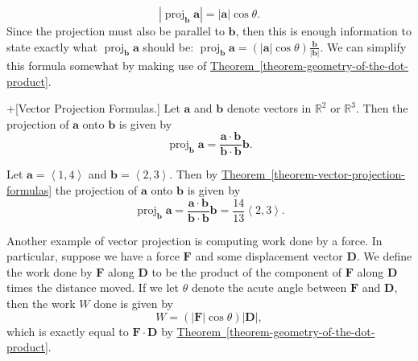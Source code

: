 \documentclass[10pt,]{book}
\theoremstyle{ptxplainnotitle}
\theoremstyle{ptxplaintitle}
\theoremstyle{ptxplainnotitle}
\theoremstyle{ptxplaintitle}
\theoremstyle{ptxplainnotitle}
\theoremstyle{ptxplaintitle}
\theoremstyle{ptxdefinitionnotitle}
\theoremstyle{ptxdefinitiontitle}
\theoremstyle{ptxdefinitionnotitle}
\theoremstyle{ptxdefinitiontitle}
\theoremstyle{ptxdefinitionnotitle}
\theoremstyle{ptxdefinitiontitle}
\theoremstyle{ptxdefinitionnotitle}
\theoremstyle{ptxdefinitiontitle}
\theoremstyle{ptxdefinitionnotitle}
\theoremstyle{ptxdefinitiontitle}
\numberwithin{equation}{section}
\newcommand{\RR}{\mathbb{R}}
\newcommand{\vv}[1]{\mathbf{#1}}
\newcommand{\dotprod}[1]{\left\langle #1 \right\rangle}
\newcommand{\proj}[2]{\operatorname{proj}_{#1} #2}
\begin{document}
%
\begin{equation*}
|\proj{\vv{b}}{\vv{a}}| = |\vv{a}|\cos\theta.
\end{equation*}
\hypertarget{p-813}{}%
Since the projection must also be parallel to \(\vv{b}\), then this is enough information to state exactly what \(\proj{\vv{b}}{\vv{a}}\) should be: \(\proj{\vv{b}}{\vv{a}} = (|\vv{a}|\cos\theta)\frac{\vv{b}}{|\vv{b}|}.\) We can simplify this formula somewhat by making use of \hyperref[theorem-geometry-of-the-dot-product]{Theorem~\ref{theorem-geometry-of-the-dot-product}}.%
\begin{theorem}+[{Vector Projection Formulas.}]\label{theorem-vector-projection-formulas}
\hypertarget{p-814}{}%
Let \(\vv{a}\) and \(\vv{b}\) denote vectors in \(\RR^{2}\) or \(\RR^{3}\). Then the projection of \(\vv{a}\) onto \(\vv{b}\) is given by%
%
\begin{equation*}
\proj{\vv{b}}{\vv{a}} = \frac{\vv{a}\cdot\vv{b}}{\vv{b}\cdot\vv{b}}\vv{b}.
\end{equation*}
\end{theorem}
\begin{example}\label{example-finding-vector-projections}
\hypertarget{p-815}{}%
Let \(\vv{a} = \dotprod{1,4}\) and \(\vv{b} = \dotprod{2,3}\). Then by \hyperref[theorem-vector-projection-formulas]{Theorem~\ref{theorem-vector-projection-formulas}} the projection of \(\vv{a}\) onto \(\vv{b}\) is given by%
%
\begin{equation*}
\proj{\vv{b}}{\vv{a}} = \frac{\vv{a}\cdot\vv{b}}{\vv{b}\cdot\vv{b}}\vv{b} = \frac{14}{13}\dotprod{2,3}.
\end{equation*}
\end{example}
\hypertarget{p-816}{}%
Another example of vector projection is computing work done by a force. In particular, suppose we have a force \(\vv{F}\) and some displacement vector \(\vv{D}\). We define the work done by \(\vv{F}\) along \(\vv{D}\) to be the product of the component of \(\vv{F}\) along \(\vv{D}\) times the distance moved. If we let \(\theta\) denote the acute angle between \(\vv{F}\) and \(\vv{D}\), then the work \(W\) done is given by%
%
\begin{equation*}
W = (|\vv{F}|\cos\theta)|\vv{D}|,
\end{equation*}
\hypertarget{p-817}{}%
which is exactly equal to \(\vv{F}\cdot\vv{D}\) by \hyperref[theorem-geometry-of-the-dot-product]{Theorem~\ref{theorem-geometry-of-the-dot-product}}.%
\end{document}

